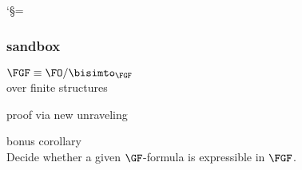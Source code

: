 \documentclass[aspectratio=169]{beamer}
\begin{document}
\catcode`§=\active

\def\tups{\textcolor{tolmutedTeal}{\elemtuples}}
\def\tupt{\textcolor{tolmutedTeal}{\elemtuplet}}
\def\ij#1{\textcolor{tolmutedWine}{(i_{#1},j_{#1})}}
\def\op#1{\textcolor{tolmutedWine}{(o_{#1},p_{#1})}}
\def\picelemOneA{%
  \tikz[baseline] {
    \tikzset{el/.style={draw, circle, minimum height=2.3ex, font=\small, inner sep=0.2ex, fill=white}};
    \node[el,anchor=base] {1};
  }%
}
\def\picelemOneB{%
  \tikz[baseline] {%
    \tikzset{el/.style={draw, circle, minimum height=2.3ex, font=\small, inner sep=0.2ex, fill=white}};
    \node[el,anchor=base] {a};
  }%
}
\def\picelemTwoA{%
  \tikz[baseline] {
    \tikzset{el/.style={draw, circle, minimum height=2.3ex, font=\small, inner sep=0.2ex, fill=white}};
    \node[el,anchor=base] {2};
  }%
}
\def\picelemTwoB{%
  \tikz[baseline] {
    \tikzset{el/.style={draw, circle, minimum height=2.3ex, font=\small, inner sep=0.2ex, fill=white}};
    \node[el,anchor=base] {b};
  }%
}
\def\ni{\textcolor{tolbrightYellowDarker}{i}}
\def\nj{\textcolor{tolbrightYellowDarker}{j}}
\begin{frame}\frametitle{sandbox}
  \begin{center}
    \huge $\FGF \equiv \FO/{\bisimto_{\FGF}}$ \\[0.5ex]
    \large over finite structures
  \end{center}

  \begin{center}
  \begin{minipage}[t]{0.4\textwidth}
    \raggedleft

    { proof via new unraveling} \\
    
  \end{minipage}
  \hspace{4em}
  \begin{minipage}[t]{0.4\textwidth}
    \raggedright

    { bonus corollary} \\[1ex]
    Decide whether a given $\GF$-formula is expressible in $\FGF$.
  \end{minipage}
\end{center}
\end{frame}
\end{document}

